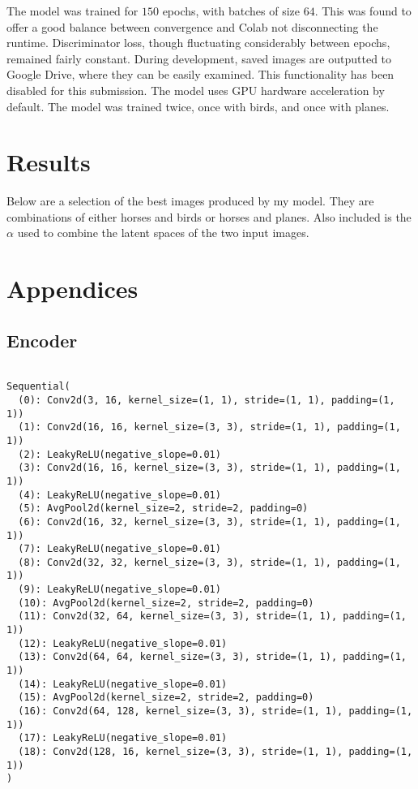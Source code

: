\documentclass[11pt]{article} %
\begin{document}
The model was trained for $150$ epochs, with batches of size $64$. This was found to offer a good balance between convergence and Colab not disconnecting the runtime. Discriminator loss, though fluctuating considerably between epochs, remained fairly constant. During development, saved images are outputted to Google Drive, where they can be easily examined. This functionality has been disabled for this submission. The model uses GPU hardware acceleration by default. The model was trained twice, once with birds, and once with planes.

\clearpage
\section{Results}

Below are a selection of the best images produced by my model. They are combinations of either horses and birds or horses and planes. Also included is the $\alpha$ used to combine the latent spaces of the two input images.

\clearpage
\section{Appendices}

\subsection{Encoder}

\begin{verbatim}

Sequential(
  (0): Conv2d(3, 16, kernel_size=(1, 1), stride=(1, 1), padding=(1, 1))
  (1): Conv2d(16, 16, kernel_size=(3, 3), stride=(1, 1), padding=(1, 1))
  (2): LeakyReLU(negative_slope=0.01)
  (3): Conv2d(16, 16, kernel_size=(3, 3), stride=(1, 1), padding=(1, 1))
  (4): LeakyReLU(negative_slope=0.01)
  (5): AvgPool2d(kernel_size=2, stride=2, padding=0)
  (6): Conv2d(16, 32, kernel_size=(3, 3), stride=(1, 1), padding=(1, 1))
  (7): LeakyReLU(negative_slope=0.01)
  (8): Conv2d(32, 32, kernel_size=(3, 3), stride=(1, 1), padding=(1, 1))
  (9): LeakyReLU(negative_slope=0.01)
  (10): AvgPool2d(kernel_size=2, stride=2, padding=0)
  (11): Conv2d(32, 64, kernel_size=(3, 3), stride=(1, 1), padding=(1, 1))
  (12): LeakyReLU(negative_slope=0.01)
  (13): Conv2d(64, 64, kernel_size=(3, 3), stride=(1, 1), padding=(1, 1))
  (14): LeakyReLU(negative_slope=0.01)
  (15): AvgPool2d(kernel_size=2, stride=2, padding=0)
  (16): Conv2d(64, 128, kernel_size=(3, 3), stride=(1, 1), padding=(1, 1))
  (17): LeakyReLU(negative_slope=0.01)
  (18): Conv2d(128, 16, kernel_size=(3, 3), stride=(1, 1), padding=(1, 1))
)

\end{verbatim}
\end{document}
